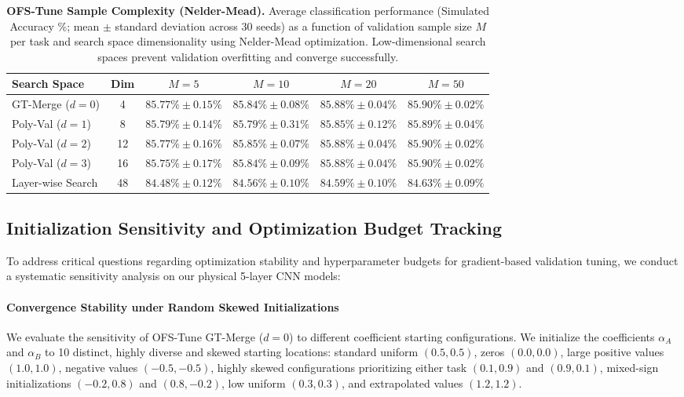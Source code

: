 \documentclass{article}
\theoremstyle{plain}
\theoremstyle{definition}
\theoremstyle{remark}
\begin{document}
\begin{table}[h!]
\caption{\textbf{OFS-Tune Sample Complexity (Nelder-Mead).} Average classification performance (Simulated Accuracy \%; mean $\pm$ standard deviation across 30 seeds) as a function of validation sample size $M$ per task and search space dimensionality using Nelder-Mead optimization. Low-dimensional search spaces prevent validation overfitting and converge successfully.}
\label{tab:sample_complexity_table}
\vskip 0.15in
\begin{center}
\begin{small}
\begin{sc}
\begin{tabular}{lccccc}
\toprule
Search Space & Dim & $M=5$ & $M=10$ & $M=20$ & $M=50$ \\
\midrule
GT-Merge ($d=0$) & 4 & $85.77\% \pm 0.15\%$ & $85.84\% \pm 0.08\%$ & $85.88\% \pm 0.04\%$ & $85.90\% \pm 0.02\%$ \\
Poly-Val ($d=1$) & 8 & $85.79\% \pm 0.14\%$ & $85.79\% \pm 0.31\%$ & $85.85\% \pm 0.12\%$ & $85.89\% \pm 0.04\%$ \\
Poly-Val ($d=2$) & 12 & $85.77\% \pm 0.16\%$ & $85.85\% \pm 0.07\%$ & $85.88\% \pm 0.04\%$ & $85.90\% \pm 0.02\%$ \\
Poly-Val ($d=3$) & 16 & $85.75\% \pm 0.17\%$ & $85.84\% \pm 0.09\%$ & $85.88\% \pm 0.04\%$ & $85.90\% \pm 0.02\%$ \\
Layer-wise Search & 48 & $84.48\% \pm 0.12\%$ & $84.56\% \pm 0.10\%$ & $84.59\% \pm 0.10\%$ & $84.63\% \pm 0.09\%$ \\
\bottomrule
\end{tabular}
\end{sc}
\end{small}
\end{center}
\vskip -0.1in
\end{table}

\subsection{Initialization Sensitivity and Optimization Budget Tracking}
\label{appendix:sensitivity_budget}

To address critical questions regarding optimization stability and hyperparameter budgets for gradient-based validation tuning, we conduct a systematic sensitivity analysis on our physical 5-layer CNN models:

\paragraph{Convergence Stability under Random Skewed Initializations}
We evaluate the sensitivity of OFS-Tune GT-Merge ($d=0$) to different coefficient starting configurations. We initialize the coefficients $\alpha_A$ and $\alpha_B$ to 10 distinct, highly diverse and skewed starting locations: standard uniform $(0.5, 0.5)$, zeros $(0.0, 0.0)$, large positive values $(1.0, 1.0)$, negative values $(-0.5, -0.5)$, highly skewed configurations prioritizing either task $(0.1, 0.9)$ and $(0.9, 0.1)$, mixed-sign initializations $(-0.2, 0.8)$ and $(0.8, -0.2)$, low uniform $(0.3, 0.3)$, and extrapolated values $(1.2, 1.2)$.
\end{document}
